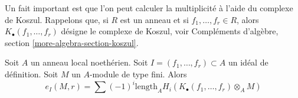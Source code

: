 \noindent
Un fait important est que l'on peut calculer la multiplicité à l'aide
du complexe de Koszul. Rappelons que, si $R$ est un anneau et si
$f_1, \ldots, f_r \in R$, alors $K_\bullet(f_1, \ldots, f_r)$
désigne le complexe de Koszul, voir
Compléments d'algèbre, section \ref{more-algebra-section-koszul}.

\begin{theorem}
\label{theorem-multiplicity-with-koszul}
\begin{reference}
\cite[Theorem 1 in part B of Chapter IV]{Serre_algebre_locale}
\end{reference}
Soit $A$ un anneau local noethérien. Soit $I = (f_1, \ldots, f_r) \subset A$
un idéal de définition. Soit $M$ un $A$-module de type fini. Alors
$$
e_I(M, r) = \sum
(-1)^i\text{length}_A H_i(K_\bullet(f_1, \ldots, f_r) \otimes_A M)
$$
\end{theorem}

